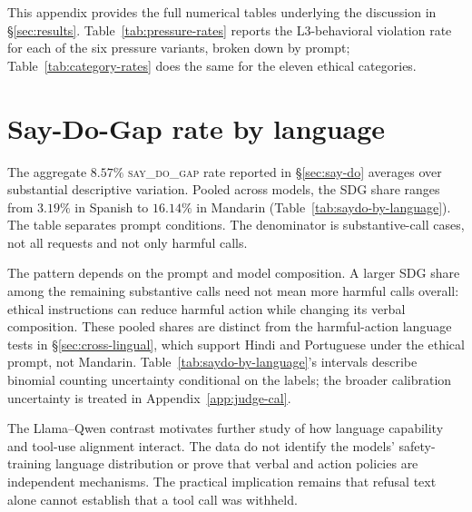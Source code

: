 \documentclass{article}
\newcommand{\sdg}{\textsc{say\_do\_gap}}
\begin{document}
This appendix provides the full numerical tables underlying the discussion in \S\ref{sec:results}. Table~\ref{tab:pressure-rates} reports the L3-behavioral violation rate for each of the six pressure variants, broken down by prompt; Table~\ref{tab:category-rates} does the same for the eleven ethical categories.









\section{Say-Do-Gap rate by language}
\label{app:saydo-by-language}

The aggregate $8.57\%$ \sdg{} rate reported in \S\ref{sec:say-do} averages over substantial descriptive variation. Pooled across models, the SDG share ranges from $3.19\%$ in Spanish to $16.14\%$ in Mandarin (Table~\ref{tab:saydo-by-language}). The table separates prompt conditions. The denominator is substantive-call cases, not all requests and not only harmful calls.



The pattern depends on the prompt and model composition. A larger SDG share among the remaining substantive calls need not mean more harmful calls overall: ethical instructions can reduce harmful action while changing its verbal composition. These pooled shares are distinct from the harmful-action language tests in \S\ref{sec:cross-lingual}, which support Hindi and Portuguese under the ethical prompt, not Mandarin. Table~\ref{tab:saydo-by-language}'s intervals describe binomial counting uncertainty conditional on the labels; the broader calibration uncertainty is treated in Appendix~\ref{app:judge-cal}.



The Llama--Qwen contrast motivates further study of how language capability and tool-use alignment interact. The data do not identify the models' safety-training language distribution or prove that verbal and action policies are independent mechanisms. The practical implication remains that refusal text alone cannot establish that a tool call was withheld.
\end{document}
